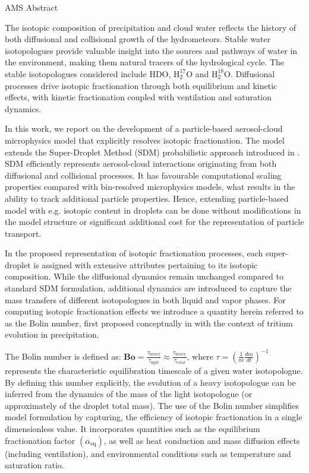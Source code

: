 \documentclass[11pt,a4paper]{article}
\begin{document}
AMS Abstract

The isotopic composition of precipitation and cloud water reflects the history
 of both diffusional and collisional growth of the hydrometeors.
Stable water isotopologues provide valuable insight into the sources and pathways
 of water in the environment, making them natural tracers of the hydrological cycle.
The stable isotopologues considered include $\mathrm{HDO}$, $\mathrm{H_2^{17}O}$ and $\mathrm{H_2^{18}O}$.
Diffusional processes drive isotopic fractionation through both equilibrium
 and kinetic effects, with kinetic fractionation coupled with ventilation
 and saturation dynamics.

In this work, we report on the development of a particle-based
 aerosol-cloud microphysics model that explicitly resolves isotopic fractionation.
The model extends the Super-Droplet Method (SDM) probabilistic approach introduced
 in \cite{2009_Shima_EtAl}.
SDM efficiently represents aerosol-cloud interactions originating from both
 diffusional and collisional processes.
It has favourable computational scaling properties compared with bin-resolved
 microphysics models,
 what results in the ability to track additional particle properties.
Hence, extending particle-based model with e.g. isotopic content in droplets can be
 done without modifications in the model structure or significant additional cost
 for the representation of particle transport.

In the proposed representation of isotopic fractionation processes, each super-droplet
 is assigned with extensive attributes pertaining to its isotopic composition.
While the diffusional dynamics remain unchanged compared to standard SDM formulation,
 additional dynamics are introduced to capture the mass transfers of different
 isotopologues in both liquid and vapor phases.
For computing isotopic fractionation effects we introduce a quantity herein referred
 to as the Bolin number, first proposed conceptually in \cite{1958_Bolin} with the context
 of tritium evolution in precipitation.

The Bolin number is defined as:
$\textbf{Bo} = \frac{\tau_\text{heavy}}{\tau_\text{light}} \approx \frac{\tau_\text{heavy}}{\tau_\text{total}}$,
 where $\tau = \left(\frac{1}{m} \frac{dm}{dt}\right)^{-1}$
 represents the characteristic equilibration timescale of a given water isotopologue.
By defining this number explicitly, the evolution of a heavy isotopologue can be
 inferred from the dynamics of the mass of the light isotopologue (or approximately
 of the droplet total mass).
The use of the Bolin number simplifies model formulation by capturing,
 the efficiency of isotopic fractionation in a single dimensionless value.
It incorporates quantities such as the equilibrium fractionation factor
 $\left(\alpha_\text{eq}\right)$, as well as heat conduction and mass diffusion
 effects (including ventilation), and environmental conditions such as temperature
 and saturation ratio.
\end{document}
